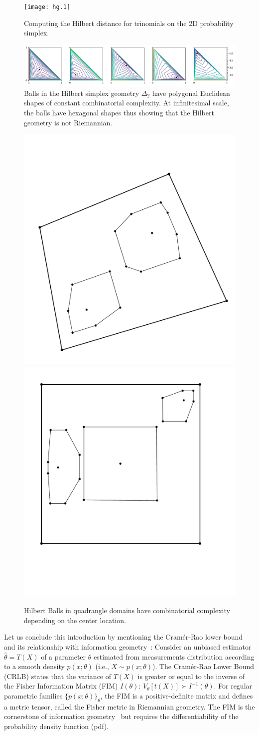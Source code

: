 \documentclass[graybox]{svmult}
\begin{document}
\begin{figure}%
\centering%
\texttt{[image: hg.1]}%
\caption{Computing the Hilbert distance for trinomials on the 2D probability simplex.}%
\label{fig:hd}%
\end{figure}

\begin{figure}%
\centering
\includegraphics[width=\textwidth]{ball}
\caption{Balls in the  Hilbert simplex geometry $\Delta_2$ have polygonal Euclidean shapes of constant combinatorial complexity.
At infinitesimal scale, the balls have hexagonal shapes thus showing that the Hilbert geometry is not Riemannian.}%
\label{fig:shape}%
\end{figure}

\begin{figure}
\centering
\includegraphics[width=.25\textwidth]{quadrangle}\hskip 3cm
\includegraphics[width=.25\textwidth]{square}
\caption{Hilbert Balls in quadrangle domains have combinatorial complexity depending on the center location.\label{fig:quad}}
\end{figure}


Let us conclude this introduction by mentioning the Cram\'er-Rao lower bound and its relationship with information geometry~\cite{CRLB-2013}:
Consider an unbiased estimator $\hat\theta=T(X)$ of a parameter $\theta$ estimated from measurements distribution according to a smooth density $p(x;\theta)$ (i.e., $X\sim p(x;\theta)$).
The  Cram\'er-Rao Lower Bound (CRLB) states that the variance of $T(X)$ is greater or equal to the inverse of the Fisher Information Matrix (FIM) $I(\theta)$: $V_\theta[t(X)]\succ I^{-1}(\theta)$. For regular parametric families $\{p(x;\theta)\}_\theta$, the FIM is a positive-definite matrix and defines a metric tensor, called the Fisher metric in Riemannian geometry. The FIM is the cornerstone of information geometry~\cite{IG-2016} but requires the differentiability of the probability density function (pdf).
\end{document}

